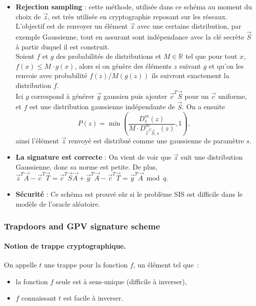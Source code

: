 \begin{itemize}
\item \textbf{Rejection sampling} : cette méthode, utilisée dans ce schéma au moment du choix de $\vec{z}$, est très utilisée en cryptographie reposant sur les réseaux. L'objectif est de renvoyer un élément $\vec{z}$ avec une certaine distribution, par exemple Gaussienne, tout en assurant sont indépendance avec la clé secrète $\vec{S}$ à partir duquel il est construit. \\
Soient $f$ et $g$ des probabilités de distributions et $M \in \mathbb{R}$ tel que pour tout $x$, $f(x) \leq M \cdot g(x)$, alors si on génère des éléments $z$ suivant $g$ et qu'on les renvoie avec probabilité $f(z) / M(g(z))$ ils suivront exactement la distribution $f$. \\
Ici $g$ correspond à générer $\vec{y}$ gaussien puis ajouter $\vec{c}^T \vec{S}$ pour un $\vec{c}$ uniforme, et $f$ est une distribution gaussienne indépendante de $\vec{S}$. On a ensuite $$P(z) = \min \left( \frac{D_{s}^m(z)}{M \cdot D_{\vec{c}^T \vec{S},s}^m(z) },1 \right),$$ ainsi l'élément $\vec{z}$ renvoyé est distribué comme une gaussienne de paramètre $s$.
\item \textbf{La signature est correcte} : On vient de voir que $\vec{z}$ suit une distribution Gaussienne, donc sa norme est petite. De plus, $\vec{z}^T \vec{A} - \vec{c}^T \vec{T} = \vec{c}^T \vec{S} \vec{A} + \vec{y}^T \vec{A} - \vec{c}^T \vec{T} = \vec{y}^T \vec{A} \bmod q$.
\item \textbf{Sécurité} : Ce schéma est prouvé sûr si le problème SIS est difficile dans le modèle de l'oracle aléatoire.
\end{itemize}

\subsubsection{Trapdoors and GPV signature scheme}

\paragraph{Notion de trappe cryptographique.} On appelle $t$ une trappe pour la fonction $f$, un élément tel que~:
\begin{itemize}
\item la fonction $f$ seule est à sens-unique (difficile à inverser),
\item $f$ connaissant $t$ est facile à inverser.
\end{itemize}


